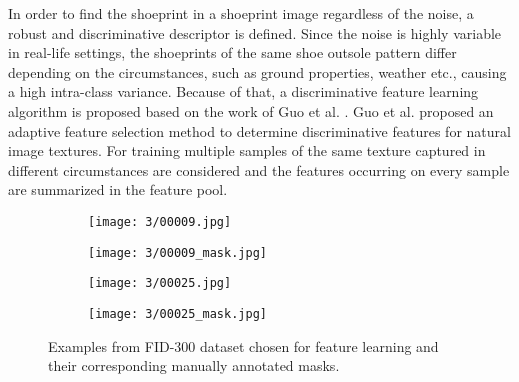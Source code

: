 \documentclass[draft,final]{vutinfth} %
\begin{document}
\par
In order to find the shoeprint in a shoeprint image regardless of the noise, a robust and discriminative descriptor is defined.
Since the noise is highly variable in real-life settings, the shoeprints of the same shoe outsole  pattern differ depending on the circumstances, such as ground properties, weather etc., causing a high intra-class variance.
Because of that, a discriminative feature learning algorithm is proposed based on the work of Guo et al. \cite{guo2012discriminative}.
Guo et al. \cite{guo2012discriminative} proposed an adaptive feature selection method to determine discriminative features for natural image textures.
For training multiple samples of the same texture captured in different circumstances are considered and the features occurring on every sample are summarized in the feature pool.

\begin{figure}[h]
  \centering
  \begin{subfigure}[t]{0.24\columnwidth}
    \centering
    \texttt{[image: 3/00009.jpg]}
  \end{subfigure}
  \begin{subfigure}[t]{0.24\columnwidth}
    \centering
    \texttt{[image: 3/00009\_mask.jpg]}
  \end{subfigure}
  \begin{subfigure}[t]{0.24\columnwidth}
    \centering
    \texttt{[image: 3/00025.jpg]}
  \end{subfigure}
  \begin{subfigure}[t]{0.24\columnwidth}
    \centering
    \texttt{[image: 3/00025\_mask.jpg]}
  \end{subfigure}
  \caption{Examples from FID-300 \cite{kortylewski2014unsupervised} dataset chosen for feature learning and their corresponding manually annotated masks.}
  \label{fig:pe:mask}
\end{figure}
\end{document}
